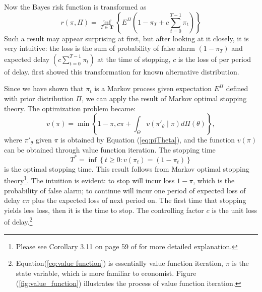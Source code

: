 \documentclass[preprint,authoryear,12pt,english]{elsarticle}
\theoremstyle{plain}
\begin{document}
Now the Bayes risk function is transformed as
\begin{equation}
    r(\pi,\Pi) = \inf_{T\in\mathbf{T}}\left\{ E^{\Pi}(1-\pi_{T}+c\sum_{t=0}^{T-1}\pi_{t})\right\}
\end{equation}
Such a result may appear surprising at first, but after looking at it closely, it is very intuitive: the loss is the sum of probability of false alarm $(1-\pi_{T})$ and expected delay $( c\sum_{t=0}^{T-1}\pi_{t})$ at the time of stopping, $c$ is the loss of per period of delay. \cite{Shiryaev1963} first showed this transformation for known alternative distribution.

Since we have shown that $\pi_{t}$ is a Markov process given expectation $E^{\Pi}$ defined with prior distribution $\Pi$, we can apply the result of Markov optimal stopping theory. The optimization problem became:
\begin{equation}
    v\left(\pi\right)=\min\left\{ 1-\pi,c\pi+ \int_{\Theta} v\left(\pi'_{\theta}\mid \pi\right) d\Pi(\theta) \right\} \label{eq:value function},
\end{equation}
where $\pi'_{\theta}$ given $\pi$ is obtained by Equation (\ref{eq:piTheta}), and the function $v(\pi)$ can be obtained through value function iteration. The stopping time
\begin{equation}
    T^{*}=\inf\left\{ t \geq 0:v\left(\pi_{t}\right)=\left(1-\pi_{t}\right)\right\} \label{equ:optimal_t}
\end{equation}
is the optimal stopping time. This result follows from Markov optimal stopping theory\footnote{Please see Corollary 3.11 on page 59 of \cite{Poor2009QuickestDetection} for more detailed explanation.}. The intuition is evident: to stop will incur loss $1-\pi$, which is the probability of false alarm; to continue will incur one period of expected loss of delay $c\pi$ plus the expected loss of next period on. The first time that stopping yields less loss, then it is the time to stop. The controlling factor $c$ is the unit loss of delay.\footnote{Equation(\ref{eq:value function}) is essentially value function iteration, $\pi$ is the state variable, which is more familiar to economist. Figure (\ref{fig:value_function}) illustrates the process of value function iteration.}
\end{document}
